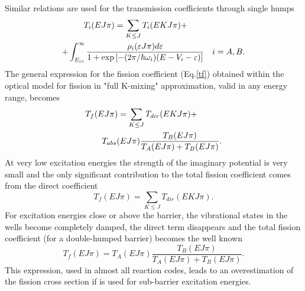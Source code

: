 Similar relations are used for the transmission coefficients through single
humps
\begin{eqnarray}
T_{i}(EJ\pi)=\sum_{K\le J}T_{i}(EKJ\pi) +\qquad\qquad\qquad\quad  \notag \\
+ \int_{E_{ci}}^{\infty} \frac {\rho_{i}(\varepsilon J\pi)d\varepsilon} {%
1+\exp\left[ -({2\pi}/\hbar\omega_{i}) (E-V_{i}-\varepsilon)\right] } \quad
i=A,B.  \label{tfi}
\end{eqnarray}
The general expression for the fission coefficient (Eq.\ref{tf}) obtained
within the optical model for fission in "full K-mixing" approximation, valid
in any energy range, becomes
\begin{eqnarray}
T_{f}(EJ\pi)=\sum_{K\le J}T_{dir}(EKJ\pi)+\qquad\quad  \notag \\
T_{abs}(E J \pi)\frac{T_{B}(E J \pi)}{T_{A}(E J \pi)+T_{B}(E J \pi)}.
\label{tfis}
\end{eqnarray}
At very low excitation energies the strength of the imaginary potential is
very small and the only significant contribution to the total fission
coefficient comes from the direct coefficient
\begin{equation}
T_{f}(EJ\pi)=\sum_{K\le J}T_{dir}(EKJ\pi).  \label{tf-zero}
\end{equation}
For excitation energies close or above the barrier, the vibrational states
in the wells become completely damped, the direct term disappears and the
total fission coefficient (for a double-humped barrier) becomes the well
known
\begin{equation}
T_{f}(E J \pi)=T_{A}(E J \pi)\frac{T_{B}(E J \pi)}{T_{A}(E J \pi)+T_{B}(E J
\pi)}.  \label{tf-full}
\end{equation}
This expression, used in almost all reaction codes, leads to an
overestimation of the fission cross section if is used for sub-barrier
excitation energies.

